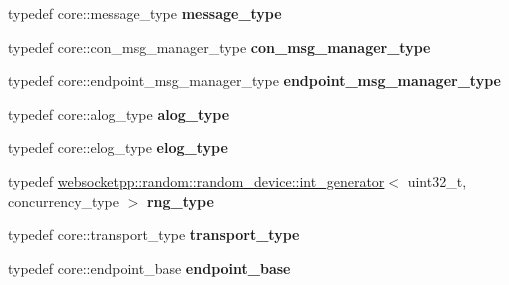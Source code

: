 \begin{DoxyCompactItemize}
typedef core\+::message\+\_\+type {\bfseries message\+\_\+type}
\item 
\mbox{\label{structstub__config_ac54fff1ce93b9e96d7c55f7a5f7070b6}} 
typedef core\+::con\+\_\+msg\+\_\+manager\+\_\+type {\bfseries con\+\_\+msg\+\_\+manager\+\_\+type}
\item 
\mbox{\label{structstub__config_a41f4e1a5902c7a558e4f06b223bff9e3}} 
typedef core\+::endpoint\+\_\+msg\+\_\+manager\+\_\+type {\bfseries endpoint\+\_\+msg\+\_\+manager\+\_\+type}
\item 
\mbox{\label{structstub__config_a0d27080bdc8a484a1c742853bcc92673}} 
typedef core\+::alog\+\_\+type {\bfseries alog\+\_\+type}
\item 
\mbox{\label{structstub__config_a48001c3d916c6e12404be8ce13e7c06d}} 
typedef core\+::elog\+\_\+type {\bfseries elog\+\_\+type}
\item 
\mbox{\label{structstub__config_a3e04f8ecafbcc47af6949fc7e8cc16d1}} 
typedef \mbox{\hyperlink{classwebsocketpp_1_1random_1_1random__device_1_1int__generator}{websocketpp\+::random\+::random\+\_\+device\+::int\+\_\+generator}}$<$ uint32\+\_\+t, concurrency\+\_\+type $>$ {\bfseries rng\+\_\+type}
\item 
\mbox{\label{structstub__config_aaada21529a6fe3cb91d8621b4b6f77ff}} 
typedef core\+::transport\+\_\+type {\bfseries transport\+\_\+type}
\item 
\mbox{\label{structstub__config_a9f66dcbba94c7b2d45f366bec76c596f}} 
typedef core\+::endpoint\+\_\+base {\bfseries endpoint\+\_\+base}
\end{DoxyCompactItemize}

